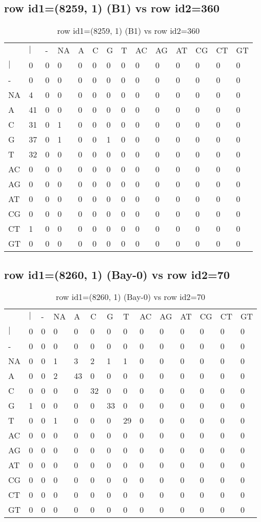 \subsection{row id1=(8259, 1) (B1) vs row id2=360}
\begin{center}
\begin{longtable}{|l|l|l|l|l|l|l|l|l|l|l|l|l|l|}
\caption{row id1=(8259, 1) (B1) vs row id2=360} \label{table_dm204}\\
\hline
\\
\hline
&$|$&-&NA&A&C&G&T&AC&AG&AT&CG&CT&GT\\
$|$&0&0&0&0&0&0&0&0&0&0&0&0&0\\
-&0&0&0&0&0&0&0&0&0&0&0&0&0\\
NA&4&0&0&0&0&0&0&0&0&0&0&0&0\\
A&41&0&0&0&0&0&0&0&0&0&0&0&0\\
C&31&0&1&0&0&0&0&0&0&0&0&0&0\\
G&37&0&1&0&0&1&0&0&0&0&0&0&0\\
T&32&0&0&0&0&0&0&0&0&0&0&0&0\\
AC&0&0&0&0&0&0&0&0&0&0&0&0&0\\
AG&0&0&0&0&0&0&0&0&0&0&0&0&0\\
AT&0&0&0&0&0&0&0&0&0&0&0&0&0\\
CG&0&0&0&0&0&0&0&0&0&0&0&0&0\\
CT&1&0&0&0&0&0&0&0&0&0&0&0&0\\
GT&0&0&0&0&0&0&0&0&0&0&0&0&0\\
\hline
\end{longtable}
\end{center}

\subsection{row id1=(8260, 1) (Bay-0) vs row id2=70}
\begin{center}
\begin{longtable}{|l|l|l|l|l|l|l|l|l|l|l|l|l|l|}
\caption{row id1=(8260, 1) (Bay-0) vs row id2=70} \label{table_dm206}\\
\hline
\\
\hline
&$|$&-&NA&A&C&G&T&AC&AG&AT&CG&CT&GT\\
$|$&0&0&0&0&0&0&0&0&0&0&0&0&0\\
-&0&0&0&0&0&0&0&0&0&0&0&0&0\\
NA&0&0&1&3&2&1&1&0&0&0&0&0&0\\
A&0&0&2&43&0&0&0&0&0&0&0&0&0\\
C&0&0&0&0&32&0&0&0&0&0&0&0&0\\
G&1&0&0&0&0&33&0&0&0&0&0&0&0\\
T&0&0&1&0&0&0&29&0&0&0&0&0&0\\
AC&0&0&0&0&0&0&0&0&0&0&0&0&0\\
AG&0&0&0&0&0&0&0&0&0&0&0&0&0\\
AT&0&0&0&0&0&0&0&0&0&0&0&0&0\\
CG&0&0&0&0&0&0&0&0&0&0&0&0&0\\
CT&0&0&0&0&0&0&0&0&0&0&0&0&0\\
GT&0&0&0&0&0&0&0&0&0&0&0&0&0\\
\hline
\end{longtable}
\end{center}

